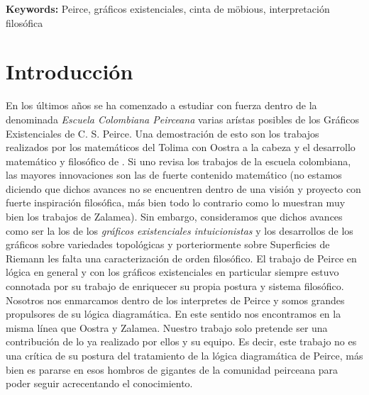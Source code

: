 \documentclass[
	fontsize=10pt, %
	twoside=true, %
	secnumdepth=1, %
	abstract=true, %
]{kaohandt}
\begin{document}
{\noindent\textbf{Keywords:} Peirce, gráficos existenciales, cinta de möbious, interpretación filosófica}

\medskip


\section{Introducción}
\label{sec:Introducción}

En los últimos años se ha comenzado a estudiar con fuerza dentro de la denominada \textit{Escuela Colombiana Peirceana} varias arístas posibles de los Gráficos Existenciales de C. S. Peirce. Una demostración de esto son los trabajos realizados por los matemáticos del Tolima con Oostra a la cabeza  y el desarrollo matemático y filosófico de . Si uno revisa los trabajos de la escuela colombiana, las mayores innovaciones son las de fuerte contenido matemático (no estamos diciendo que dichos avances no se encuentren dentro de una visión y proyecto con fuerte inspiración filosófica, más bien todo lo contrario como lo muestran muy bien los trabajos de Zalamea). Sin embargo, consideramos que dichos avances como ser la los de los \textit{gráficos existenciales intuicionistas} y los desarrollos de los gráficos sobre variedades topológicas y porteriormente sobre Superficies de Riemann les falta una caracterización de orden filosófico. El trabajo de Peirce en lógica en general y con los gráficos existenciales en particular siempre estuvo connotada por su trabajo de enriquecer su propia postura y sistema filosófico. Nosotros nos enmarcamos dentro de los interpretes de Peirce y somos grandes propulsores de su lógica diagramática. En este sentido nos encontramos en la misma línea que Oostra y Zalamea. Nuestro trabajo solo pretende ser una contribución de lo ya realizado por ellos y su equipo. Es decir, este trabajo no es una crítica de su postura del tratamiento de la lógica diagramática de Peirce, más bien es pararse en esos hombros de gigantes de la comunidad peirceana para poder seguir acrecentando el conocimiento.
\end{document}
